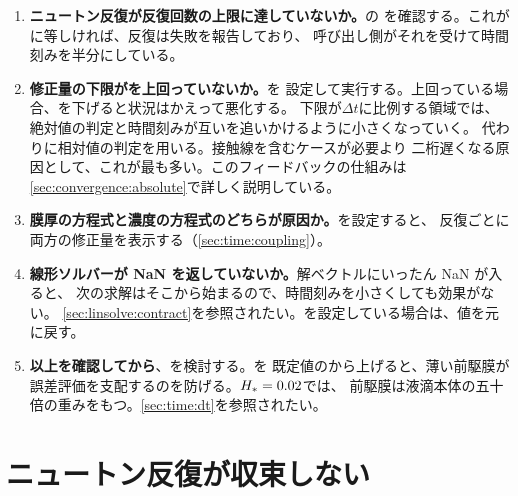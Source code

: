 \begin{enumerate}
  \item \textbf{ニュートン反復が反復回数の上限に達していないか。}の
    を確認する。これがに等しければ、反復は失敗を報告しており、
    呼び出し側がそれを受けて時間刻みを半分にしている。
  \item \textbf{修正量の下限がを上回っていないか。}を
    設定して実行する。上回っている場合、を下げると状況はかえって悪化する。
    下限が$\Delta t$に比例する領域では、絶対値の判定と時間刻みが互いを追いかけるように小さくなっていく。
    代わりに相対値の判定を用いる。接触線を含むケースが必要より
    二桁遅くなる原因として、これが最も多い。このフィードバックの仕組みは
    \cref{sec:convergence:absolute}で詳しく説明している。
  \item \textbf{膜厚の方程式と濃度の方程式のどちらが原因か。}を設定すると、
    反復ごとに両方の修正量を表示する（\cref{sec:time:coupling}）。
  \item \textbf{線形ソルバーが NaN を返していないか。}解ベクトルにいったん NaN が入ると、
    次の求解はそこから始まるので、時間刻みを小さくしても効果がない。
    \cref{sec:linsolve:contract}を参照されたい。を設定している場合は、値を元に戻す。
  \item \textbf{以上を確認してから}、を検討する。を
    既定値のから上げると、薄い前駆膜が誤差評価を支配するのを防げる。$H_{*} = 0.02$では、
    前駆膜は液滴本体の五十倍の重みをもつ。\cref{sec:time:dt}を参照されたい。
\end{enumerate}

\section{ニュートン反復が収束しない}
\label{sec:trouble:newton}


